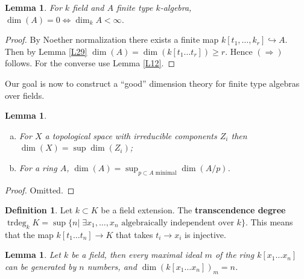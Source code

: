 \documentclass{article}
\DeclareMathOperator{\trdeg}{trdeg}
\theoremstyle{plain}
\newtheorem{lem}[thm]{Lemma}
\theoremstyle{definition}
\newtheorem{defn}{Definition}
\theoremstyle{remark}
\begin{document}
\begin{lem}
\label{L51}
For $k$ field and $A$ finite type $k$-algebra, $\dim(A) = 0 \Leftrightarrow \dim_k A < \infty$.
\end{lem}

\begin{proof}
By Noether normalization there exists a finite map $k[t_1, \dots, k_r] \hookrightarrow A$. Then by Lemma \ref{L29} $\dim(A) = \dim(k[t_1 \dots t_r]) \geq r$. Hence $(\Rightarrow)$ follows. For the converse use Lemma \ref{L12}.
\end{proof}
Our goal is now to construct a ``good'' dimension theory for finite type algebras over fields.

\begin{lem}\hspace{1mm}
\label{L51}
\begin{enumerate}[(a)]
\item For $X$ a topological space with irreducible components $Z_i$ then $\dim(X) = \sup \dim(Z_i)$;
\item For a ring $A$, $\dim(A) = \sup_{p\subset A \text{ minimal}} \dim(A/p)$.
\end{enumerate}
\end{lem}
\begin{proof}
Omitted.
\end{proof}

\begin{defn}
Let $k\subset K$ be a field extension. The \textbf{transcendence degree} $\trdeg_k K = \sup \{n|\; \exists x_1, \dots, x_n \text{ algebraically independent over } k\}$. This means that the map $k[t_1 \dots t_n] \to K$ that takes $t_i \to x_i$ is injective.
\end{defn}


\begin{lem}
\label{L52}
Let $k$ be a field, then every maximal ideal $m$ of the ring $k[x_1 \dots x_n]$ can be generated by $n$ numbers, and $\dim(k[x_1 \dots x_n])_{m} = n$.
\end{lem}
\end{document}
